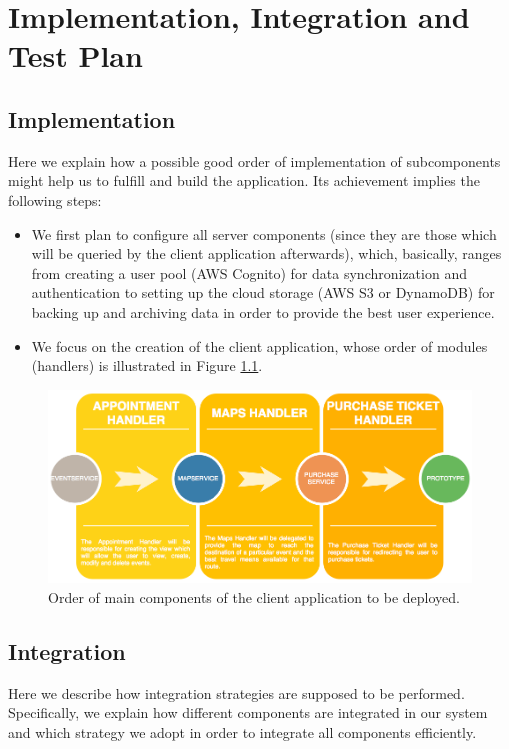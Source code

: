 \chapter{Implementation, Integration and Test Plan}
\label{cha:impl}

\section*{Implementation}
Here we explain how a possible good order of implementation of subcomponents might help us to fulfill and build the application. Its achievement implies the following steps:
\begin{itemize}
\item We first plan to configure all server components (since they are those which will be queried by the client application afterwards), which, basically, ranges from creating a user pool (AWS Cognito) for data synchronization and authentication to setting up the cloud storage (AWS S3 or DynamoDB) for backing up and archiving data in order to provide the best user experience. 
\item We focus on the creation of the client application, whose order of modules (handlers) is illustrated in Figure \ref{fig:componentsDiagram}.
\end{itemize}

\begin{figure}[H]
	\centering
	\includegraphics[width=6.5in]{./diagrams/ComponentsOrderDiagram.png}
	\caption{Order of main components of the client application to be deployed.}
	\label{fig:componentsDiagram}
\end{figure}

\section*{Integration}
Here we describe how integration strategies are supposed to be performed. Specifically, we explain how different components are integrated in our system and which strategy we adopt in order to integrate all components efficiently.

